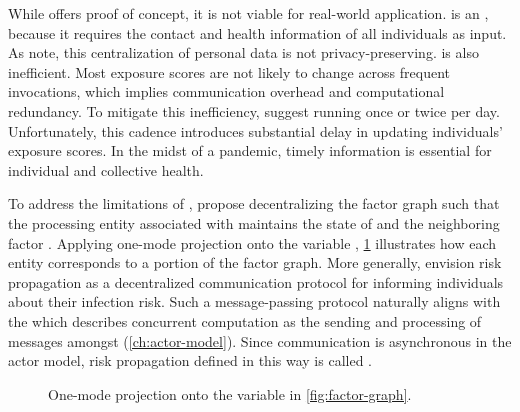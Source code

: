 While \cRiskPropagation offers proof of concept, it is not viable for real-world application. \cRiskPropagation is an  \citep{Cormen2022}, because it requires the contact and health information of all individuals as input. As \citet{Ayday2021} note, this centralization of personal data is not privacy-preserving. \cRiskPropagation is also inefficient. Most exposure scores are not likely to change across frequent invocations, which implies communication overhead and computational redundancy. To mitigate this inefficiency, \citet{Ayday2020} suggest running \cRiskPropagation once or twice per day. Unfortunately, this cadence introduces substantial delay in updating individuals' exposure scores. In the midst of a pandemic, timely information is essential for individual and collective health.

To address the limitations of \cRiskPropagation, \citet{Ayday2021} propose decentralizing the factor graph such that the processing entity associated with  maintains the state of  and the neighboring factor \verticesName. Applying one-mode projection onto the variable \verticesName \citep{Zhou2007}, \cref{fig:projected} illustrates how each entity corresponds to a portion of the factor graph. More generally, \citet{Ayday2021} envision risk propagation as a decentralized communication protocol for informing individuals about their infection risk. Such a message-passing protocol naturally aligns with the  which describes concurrent computation as the sending and processing of messages amongst  (\cref{ch:actor-model}). Since communication is asynchronous in the actor model, risk propagation defined in this way is called .

\begin{figure}[htb]
\centering
{}
\caption[One-mode projection of the factor graph]{One-mode projection onto the variable \verticesName in \cref{fig:factor-graph}.}
\label{fig:projected}
\end{figure}

